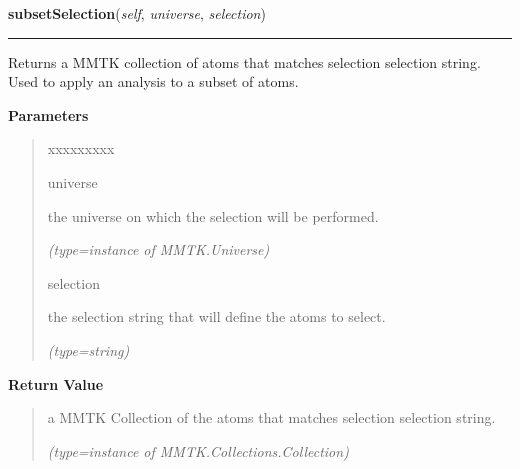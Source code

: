     \label{nMOLDYN:Analysis:Analysis:Analysis:subsetSelection}

    \vspace{0.5ex}

\hspace{.8\funcindent}\begin{boxedminipage}{\funcwidth}

    \raggedright \textbf{subsetSelection}(\textit{self}, \textit{universe}, \textit{selection})

    \vspace{-1.5ex}

    \rule{\textwidth}{0.5\fboxrule}
\setlength{\parskip}{2ex}
    Returns a MMTK collection of atoms that matches 
    {\textbar}selection{\textbar} selection string. Used to apply an 
    analysis to a subset of atoms.

\setlength{\parskip}{1ex}
      \textbf{Parameters}
      \vspace{-1ex}

      \begin{quote}
        \begin{Ventry}{xxxxxxxxx}

          \item[universe]

          the universe on which the selection will be performed.

            {\it (type=instance of MMTK.Universe)}

          \item[selection]

          the selection string that will define the atoms to select.

            {\it (type=string)}

        \end{Ventry}

      \end{quote}

      \textbf{Return Value}
    \vspace{-1ex}

      \begin{quote}
      a MMTK Collection of the atoms that matches 
      {\textbar}selection{\textbar} selection string.

      {\it (type=instance of MMTK.Collections.Collection)}

      \end{quote}

    \end{boxedminipage}


